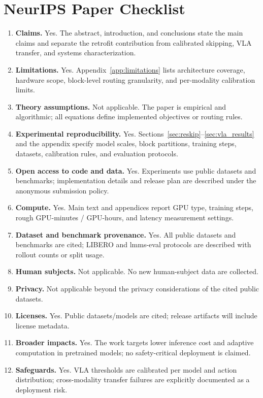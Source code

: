 \documentclass{article}
\begin{document}
\section{NeurIPS Paper Checklist}
\label{app:checklist}
\begin{enumerate}
\item \textbf{Claims.} Yes. The abstract, introduction, and conclusions state the main claims and separate the retrofit contribution from calibrated skipping, VLA transfer, and systems characterization.
\item \textbf{Limitations.} Yes. Appendix~\ref{app:limitations} lists architecture coverage, hardware scope, block-level routing granularity, and per-modality calibration limits.
\item \textbf{Theory assumptions.} Not applicable. The paper is empirical and algorithmic; all equations define implemented objectives or routing rules.
\item \textbf{Experimental reproducibility.} Yes. Sections~\ref{sec:reskip}--\ref{sec:vla_results} and the appendix specify model scales, block partitions, training steps, datasets, calibration rules, and evaluation protocols.
\item \textbf{Open access to code and data.} Yes. Experiments use public datasets and benchmarks; implementation details and release plan are described under the anonymous submission policy.
\item \textbf{Compute.} Yes. Main text and appendices report GPU type, training steps, rough GPU-minutes / GPU-hours, and latency measurement settings.
\item \textbf{Dataset and benchmark provenance.} Yes. All public datasets and benchmarks are cited; LIBERO and lmms-eval protocols are described with rollout counts or split usage.
\item \textbf{Human subjects.} Not applicable. No new human-subject data are collected.
\item \textbf{Privacy.} Not applicable beyond the privacy considerations of the cited public datasets.
\item \textbf{Licenses.} Yes. Public datasets/models are cited; release artifacts will include license metadata.
\item \textbf{Broader impacts.} Yes. The work targets lower inference cost and adaptive computation in pretrained models; no safety-critical deployment is claimed.
\item \textbf{Safeguards.} Yes. VLA thresholds are calibrated per model and action distribution; cross-modality transfer failures are explicitly documented as a deployment risk.
\end{enumerate}
\end{document}
